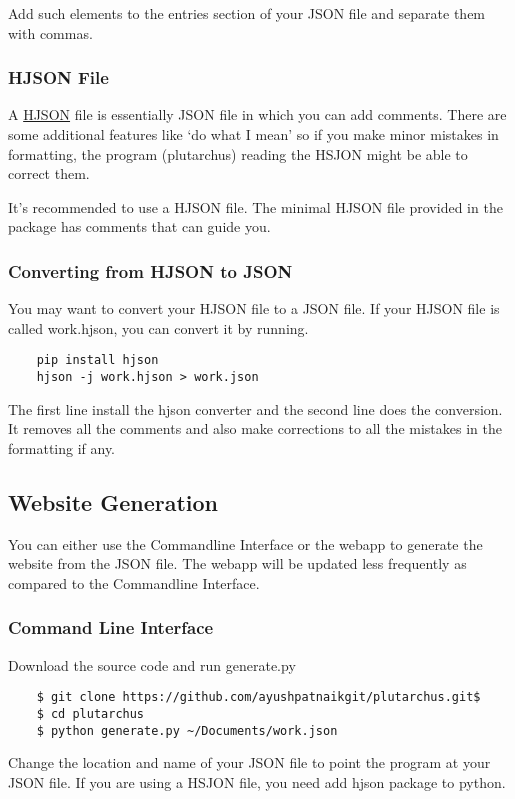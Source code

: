 \documentclass[12pt]{article}
\begin{document}
    Add such elements to the entries section of your JSON file and separate them with commas. 

    \subsubsection{HJSON File}

    A \href{https://hjson.org/}{HJSON} file is essentially JSON file in which you can add comments. There are some additional features like `do what I mean' so if you make minor mistakes in formatting, the program (plutarchus) reading the HSJON might be able to correct them.
    
    It's recommended to use a HJSON file. The minimal HJSON file provided in the package has comments that can guide you. 

    \subsubsection{Converting from HJSON to JSON}
    You may want to convert your HJSON file to a JSON file. If your HJSON file is called work.hjson, you can convert it by running. 
    \begin{verbatim}
    pip install hjson
    hjson -j work.hjson > work.json
    \end{verbatim}
    The first line install the hjson converter and the second line does the conversion.
    It removes all the comments and also make corrections to all the mistakes in the formatting if any.

    \subsection{Website Generation}
    
    You can either use the Commandline Interface or the webapp to 
    generate the website from the JSON file. The webapp will be updated less frequently as compared to the Commandline Interface.

    \subsubsection{Command Line Interface}

    Download the source code and run generate.py
    \begin{verbatim}
    $ git clone https://github.com/ayushpatnaikgit/plutarchus.git$
    $ cd plutarchus
    $ python generate.py ~/Documents/work.json 
    \end{verbatim}
    Change the location and name of your JSON file to point the program at your JSON file. 
    If you are using a HSJON file, you need add hjson package to python. 
\end{document}
